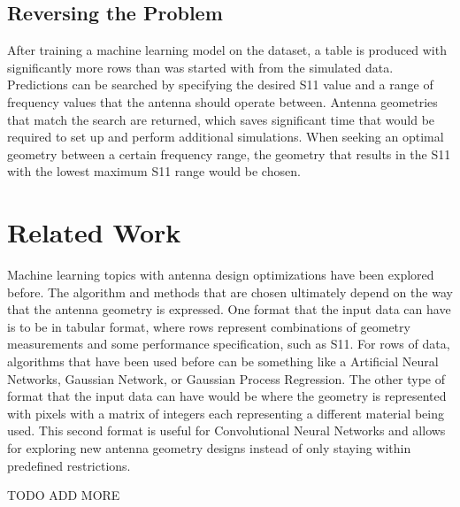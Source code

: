 \documentclass[lettersize,journal]{IEEEtran}
\begin{document}
\subsection{Reversing the Problem}
After training a machine learning model on the dataset, a table is produced with significantly more rows than was started with from the simulated data. Predictions can be searched by specifying the desired S11 value and a range of frequency values that the antenna should operate between. Antenna geometries that match the search are returned, which saves significant time that would be required to set up and perform additional simulations. When seeking an optimal geometry between a certain frequency range, the geometry that results in the S11 with the lowest maximum S11 range would be chosen.


\section{Related Work}
Machine learning topics with antenna design optimizations have been explored before. The algorithm and methods that are chosen ultimately depend on the way that the antenna geometry is expressed. One format that the input data can have is to be in tabular format, where rows represent combinations of geometry measurements and some performance specification, such as S11. For rows of data, algorithms that have been used before can be something like a Artificial Neural Networks, Gaussian Network, or Gaussian Process Regression. The other type of format that the input data can have would be where the geometry is represented with pixels with a matrix of integers each representing a different material being used. This second format is useful for Convolutional Neural Networks and allows for exploring new antenna geometry designs instead of only staying within predefined restrictions.~\cite{wu_machine_2023} 

TODO ADD MORE 
\end{document}
